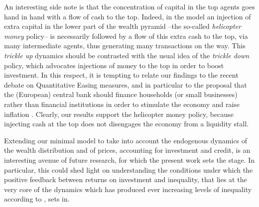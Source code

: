 An interesting side note is that the concentration of capital in the top agents goes hand in hand with a flow of cash to the top. Indeed, in the model an injection of extra capital in the lower part of the wealth pyramid --the so-called {\em helicopter money} policy-- is necessarily followed by a flow of this extra cash to the top, via many intermediate agents, thus generating many transactions on the way. This \textit{trickle up} dynamics should be contrasted with the usual idea of the \textit{trickle down} policy, which advocates injections of money to the top in order to boost investment. In this respect, it is tempting to relate our findings to the recent debate on Quantitative Easing measures, and in particular to the proposal that the (European) central bank should finance households (or small businesses) rather than financial institutions in order to stimulate the economy and raise inflation \cite{QEvox,QEft}. Clearly, our results support the helicopter money policy, because injecting cash at the top does not disengages the economy from a liquidity stall. 

Extending our minimal model to take into account the endogenous dynamics of the wealth distribution and of prices, accounting for investment and credit, is an interesting avenue of future research, for which the present work sets the stage. In particular, this could shed light on understanding the conditions under which the positive feedback between returns on investment and inequality, that lies at the very core of the dynamics which has produced ever increasing levels of inequality according to \cite{Piketty2001,Piketty2014,SaezZucman2016}, sets in.